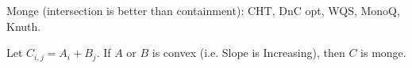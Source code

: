 Monge (intersection is better than containment): CHT, DnC opt, WQS, MonoQ, Knuth.

Let $C_{i, j} = A_i + B_j$.
If $A$ or $B$ is convex (i.e. Slope is Increasing), then $C$ is monge.